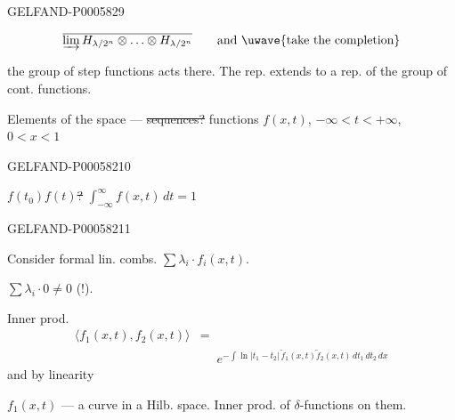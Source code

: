 \begin{GelfandAdjacentEvidence}{GELFAND-P000582}{9}

\[
\overline{\varinjlim H_{\lambda/2^n}\otimes\ldots\otimes H_{\lambda/2^n}}
\qquad\text{and \uwave{take the completion}}
\]

the group of step functions acts there. The rep. extends to a rep. of the group of cont. functions.

Elements of the space — \sout{sequences?} functions \(f(x,t)\), \(-\infty<t<+\infty\), \(0<x<1\)
\end{GelfandAdjacentEvidence}
\begin{GelfandAdjacentEvidence}{GELFAND-P000582}{10}

\sout{\mbox{\(f(t_0)f(t)\)}?}\qquad
\(\displaystyle\int_{-\infty}^{\infty}f(x,t)\,dt=1\)
\end{GelfandAdjacentEvidence}
\begin{GelfandAdjacentEvidence}{GELFAND-P000582}{11}


Consider formal lin. combs. \(\sum\lambda_i\cdot f_i(x,t)\).

\(\sum\lambda_i\cdot0\ne0\) (!).

Inner prod.
\[
\begin{aligned}
\langle f_1(x,t),f_2(x,t)\rangle&=\\
&\mathrel{\phantom{=}}
e^{-\int\ln\lvert t_1-t_2\rvert\,\widetilde f_1(x,t)\widetilde f_2(x,t)\,dt_1\,dt_2\,dx}
\end{aligned}
\]
\hfill and by linearity\par
{}
\end{GelfandAdjacentEvidence}

\(f_1(x,t)\) — a curve in a Hilb. space. Inner prod. of \(\delta\)-functions on them.


